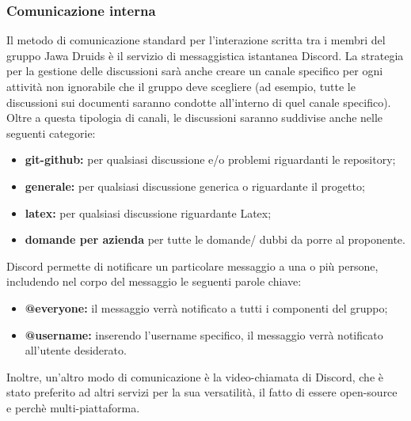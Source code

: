 \subsubsection{Comunicazione interna}\label{4.1.2.1}
Il metodo di comunicazione standard per l'interazione scritta tra i membri del gruppo Jawa Druids è il servizio di messaggistica istantanea Discord.
La strategia per la gestione delle discussioni sarà anche creare un canale specifico per ogni attività non ignorabile che il gruppo deve scegliere (ad esempio, tutte le discussioni sui documenti saranno condotte all'interno di quel canale specifico).
Oltre a questa tipologia di canali, le discussioni saranno suddivise anche nelle seguenti categorie:
\begin{itemize}
\item \textbf{git-github:} per qualsiasi discussione e/o problemi riguardanti le repository;
	\item\textbf{generale:} per qualsiasi discussione generica o riguardante il progetto;
	\item\textbf{latex:} per qualsiasi discussione riguardante Latex;
	\item\textbf{domande per azienda} per tutte le domande/ dubbi da porre al proponente.
\end{itemize}
Discord permette di notificare un particolare messaggio a una o più persone, includendo nel corpo del messaggio le seguenti parole chiave:
\begin{itemize}
\item \textbf{@everyone:} il messaggio verrà notificato a tutti i componenti del gruppo;
	\item \textbf{@username:} inserendo l'username specifico, il messaggio verrà notificato all'utente desiderato.
\end{itemize}
Inoltre, un'altro modo di comunicazione è la video-chiamata di Discord, che è stato preferito ad altri servizi per la sua versatilità, il fatto di essere open-source e perchè multi-piattaforma.	
